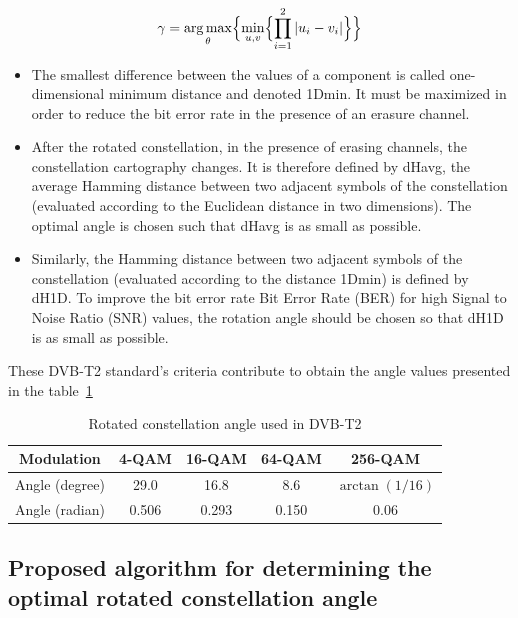 \begin{equation}
  \gamma = \operatorname*{arg\,max}_{\theta}
  \Bigl\{\min_{u,v}\Bigl\{\prod_{i=1}^{2}|u_i - v_i|\Bigr\}\Bigr\}
  \label{eq:gamma}
\end{equation}

\begin{itemize}
  \item The smallest difference between the values of a component is called
  one-dimensional minimum distance and denoted 1Dmin. It must be maximized
  in order to reduce the bit error rate in the presence of an erasure
  channel.

  \item After the rotated constellation, in the presence of erasing
  channels, the constellation cartography changes. It is therefore defined
  by dHavg, the average Hamming distance between two adjacent symbols of the
  constellation (evaluated according to the Euclidean distance in two
  dimensions). The optimal angle is chosen such that dHavg is as small as
  possible.

  \item Similarly, the Hamming distance between two adjacent symbols of the
  constellation (evaluated according to the distance 1Dmin) is defined by
  dH1D. To improve the bit error rate Bit Error Rate (BER) for high Signal
  to Noise Ratio (SNR) values, the rotation angle should be chosen so that
  dH1D is as small as possible.
\end{itemize}

These DVB-T2 standard's criteria contribute to obtain the angle values
presented in the table~\ref{tab:angles-dvbt2}

\begin{table}[!t]
  \renewcommand{\arraystretch}{1.1}
  \caption{Rotated constellation angle used in DVB-T2}
  \label{tab:angles-dvbt2}
  \centering
  \begin{tabular}{|c|c|c|c|c|}
    \hline
    Modulation     & 4-QAM & 16-QAM & 64-QAM & 256-QAM \\
    \hline
    Angle (degree) & 29.0  & 16.8   & 8.6    & $\arctan(1/16)$ \\
    \hline
    Angle (radian) & 0.506 & 0.293  & 0.150  & 0.06 \\
    \hline
  \end{tabular}
\end{table}

\subsection{Proposed algorithm for determining the optimal rotated
constellation angle}
\label{subsec:algorithm}

